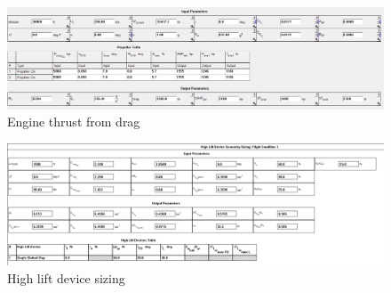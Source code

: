\documentclass[conf]{new-aiaa}
\begin{document}
\begin{figure}[H]
	\centering
	\includegraphics[width=\textwidth]{TwinSeaLionReport2Printouts/enginethrustfromdrag}
	\caption{Engine thrust from drag}
	\label{fig:enginethrustfromdrag}
\end{figure}
\begin{figure}[H]
	\centering
	\includegraphics[width=\textwidth]{TwinSeaLionReport2Printouts/HighLiftDeviceSizing}
	\caption{High lift device sizing}
	\label{fig:HighLiftDeviceSizing}
\end{figure}
\end{document}
